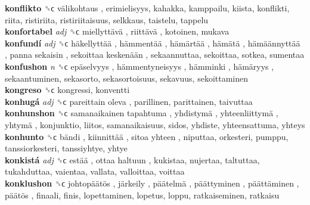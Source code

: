 \textbf{konflikto} ␝ϲ   välikohtaus , erimielisyys, kahakka, kamppailu, kiista, konflikti, riita, ristiriita, ristiriitaisuus, selkkaus, taistelu, tappelu  \\
\textbf{konfortabel} \emph{adj}  ␝ϲ   miellyttävä ,  riittävä , kotoinen, mukava  \\
\textbf{konfundí} \emph{adj}  ␝ϲ   häkellyttää ,  hämmentää ,  hämärtää ,  hämätä ,  hämäännyttää ,  panna sekaisin ,  sekoittaa keskenään , sekaannuttaa, sekoittaa, sotkea, sumentaa  \\
\textbf{konfushon} \emph{n}  ␝ϲ   epäselvyys ,  hämmentyneisyys ,  hämminki ,  hämäryys , sekaantuminen, sekasorto, sekasortoisuus, sekavuus, sekoittaminen  \\
\textbf{kongreso} ␝ϲ  kongressi, konventti  \\
\textbf{konhugá} \emph{adj}  ␝ϲ   pareittain oleva , parillinen, parittainen, taivuttaa  \\
\textbf{konhunshon} ␝ϲ   samanaikainen tapahtuma ,  yhdistymä ,  yhteenliittymä ,  yhtymä , konjunktio, liitos, samanaikaisuus, sidos, yhdiste, yhteensattuma, yhteys  \\
\textbf{konhunto} ␝ϲ   bändi ,  kiinnittää ,  sitoa yhteen , niputtaa, orkesteri, pumppu, tanssiorkesteri, tanssiyhtye, yhtye  \\
\textbf{konkistá} \emph{adj}  ␝ϲ   estää ,  ottaa haltuun , kukistaa, nujertaa, taltuttaa, tukahduttaa, vaientaa, vallata, valloittaa, voittaa  \\
\textbf{konklushon} ␝ϲ   johtopäätös ,  järkeily ,  päätelmä ,  päättyminen ,  päättäminen ,  päätös , finaali, finis, lopettaminen, lopetus, loppu, ratkaiseminen, ratkaisu  \\
